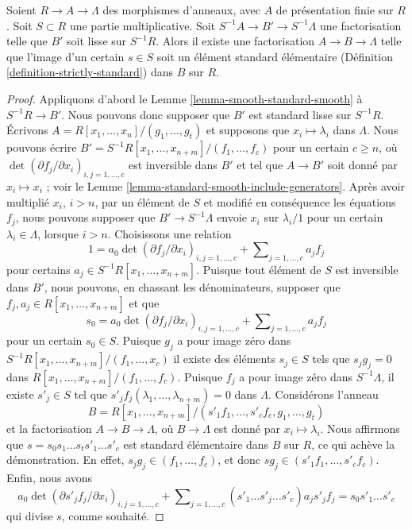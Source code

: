 \begin{lemma}
\label{lemma-delocalize-base}
Soient $R \to A \to \Lambda$ des morphismes d'anneaux, avec $A$ de présentation finie
sur $R$. Soit $S \subset R$ une partie
multiplicative. Soit $S^{-1}A \to B' \to S^{-1}\Lambda$ une factorisation telle que
$B'$ soit lisse sur $S^{-1}R$. Alors il existe une factorisation
$A \to B \to \Lambda$ telle que l'image d'un certain $s \in S$ soit un
élément standard élémentaire (Définition \ref{definition-strictly-standard})
dans $B$ sur $R$.
\end{lemma}

\begin{proof}
Appliquons d'abord le Lemme \ref{lemma-smooth-standard-smooth} à $S^{-1}R \to B'$.
Nous pouvons donc supposer que $B'$ est standard lisse sur $S^{-1}R$.
Écrivons $A = R[x_1, \ldots, x_n]/(g_1, \ldots, g_t)$ et supposons que
$x_i \mapsto \lambda_i$ dans $\Lambda$. Nous pouvons écrire
$B' = S^{-1}R[x_1, \ldots, x_{n + m}]/(f_1, \ldots, f_c)$
pour un certain $c \geq n$, où
$\det(\partial f_j/\partial x_i)_{i, j = 1, \ldots, c}$
est inversible dans $B'$ et tel que $A \to B'$ soit donné par $x_i \mapsto x_i$ ;
voir le Lemme \ref{lemma-standard-smooth-include-generators}.
Après avoir multiplié $x_i$, $i > n$, par un élément de $S$ et modifié en conséquence
les équations $f_j$, nous pouvons supposer que $B' \to S^{-1}\Lambda$ envoie
$x_i$ sur $\lambda_i/1$ pour un certain $\lambda_i \in \Lambda$, lorsque $i > n$.
Choisissons une relation
$$
1 =
a_0 \det(\partial f_j/\partial x_i)_{i, j = 1, \ldots, c}
+
\sum\nolimits_{j = 1, \ldots, c} a_jf_j
$$
pour certains $a_j \in S^{-1}R[x_1, \ldots, x_{n + m}]$. Puisque tout élément de $S$
est inversible dans $B'$, nous pouvons, en chassant les dénominateurs, supposer que
$f_j, a_j \in R[x_1, \ldots, x_{n + m}]$ et que
$$
s_0 = a_0 \det(\partial f_j/\partial x_i)_{i, j = 1, \ldots, c}
+
\sum\nolimits_{j = 1, \ldots, c} a_jf_j
$$
pour un certain $s_0 \in S$. Puisque $g_j$ a pour image zéro dans
$S^{-1}R[x_1, \ldots, x_{n + m}]/(f_1, \ldots, x_c)$
il existe des éléments $s_j \in S$ tels que $s_j g_j = 0$ dans
$R[x_1, \ldots, x_{n + m}]/(f_1, \ldots, f_c)$.
Puisque $f_j$ a pour image zéro dans $S^{-1}\Lambda$, il existe $s'_j \in S$
tel que $s'_j f_j(\lambda_1, \ldots, \lambda_{n + m}) = 0$ dans
$\Lambda$. Considérons l'anneau
$$
B = R[x_1, \ldots, x_{n + m}]/
(s'_1f_1, \ldots, s'_cf_c, g_1, \ldots, g_t)
$$
et la factorisation $A \to B \to \Lambda$, où $B \to \Lambda$ est donné par
$x_i \mapsto \lambda_i$. Nous affirmons que $s = s_0s_1 \ldots s_ts'_1 \ldots s'_c$
est standard élémentaire dans $B$ sur $R$, ce qui achève la démonstration.
En effet, $s_j g_j \in (f_1, \ldots, f_c)$, et donc
$sg_j \in (s'_1f_1, \ldots, s'_cf_c)$. Enfin, nous avons
$$
a_0\det(\partial s'_jf_j/\partial x_i)_{i, j = 1, \ldots, c}
+
\sum\nolimits_{j = 1, \ldots, c}
(s'_1 \ldots \hat{s'_j} \ldots s'_c) a_j s'_jf_j
=
s_0s'_1\ldots s'_c
$$
qui divise $s$, comme souhaité.
\end{proof}

